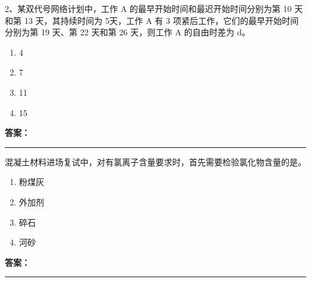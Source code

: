 \documentclass[UTF8,fontset=fandol,11pt]{ctexart}
\newcommand{\answerline}{\textcolor{answerred}{\rule{2.4cm}{0.7pt}}}
\begin{document}
\begin{quizbox}[title={乱序第 158 题｜第十一章网络计划技术}]

2、某双代号网络计划中，工作 A 的最早开始时间和最迟开始时间分别为第 10 天和第 13 天，其持续时间为 5天，工作 A 有 3 项紧后工作，它们的最早开始时间分别为第 19 天、第 22 天和第 26 天，则工作 A 的自由时差为 d。\\

\begin{enumerate}[label=\Alph*.]

\item 4

\item 7

\item 11

\item 15

\end{enumerate}

\textbf{\textcolor{answerred}{答案：}} \answerline

\end{quizbox}

\vspace{0.2em}

\begin{quizbox}[title={乱序第 159 题｜第四章混凝土结构工程}]

混凝土材料进场复试中，对有氯离子含量要求时，首先需要检验氯化物含量的是。\\

\begin{enumerate}[label=\Alph*.]

\item 粉煤灰

\item 外加剂

\item 碎石

\item 河砂

\end{enumerate}

\textbf{\textcolor{answerred}{答案：}} \answerline

\end{quizbox}

\vspace{0.2em}
\end{document}
